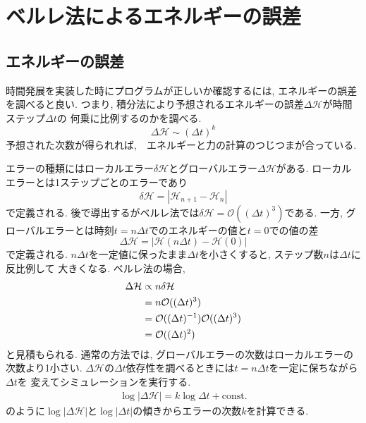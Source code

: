 \section{ベルレ法によるエネルギーの誤差}
\subsection{エネルギーの誤差}
時間発展を実装した時にプログラムが正しいか確認するには, エネルギーの誤差を調べると良い.
つまり, 積分法により予想されるエネルギーの誤差$\Delta \mathcal{H}$が時間ステップ$\Delta t$の
何乗に比例するのかを調べる.
\begin{equation}
 \Delta \mathcal{H} \sim (\Delta t)^{k}
\end{equation}
予想された次数が得られれば,　エネルギーと力の計算のつじつまが合っている.

エラーの種類にはローカルエラー$\delta \mathcal{H}$とグローバルエラー$\Delta \mathcal{H}$がある.
ローカルエラーとは1ステップごとのエラーであり
\begin{equation}
 \delta \mathcal{H} = |\mathcal{H}_{n+1} - \mathcal{H}_{n}|
\end{equation}
で定義される. 
後で導出するがベルレ法では$\delta \mathcal{H} = \mathcal{O}((\Delta t)^{3})$である.
一方, グローバルエラーとは時刻$t = n \Delta t$でのエネルギーの値と$t=0$での値の差
\begin{equation}
 \Delta \mathcal{H} = |\mathcal{H}(n \Delta t) - \mathcal{H}(0)|
\end{equation}
で定義される.
$n \Delta t$を一定値に保ったまま$\Delta t$を小さくすると, ステップ数$n$は$\Delta t$に反比例して
大きくなる. ベルレ法の場合,
\begin{align}
  \Delta \mathcal{H} 
&\propto 
   n \delta \mathcal{H} \notag \\
&= n \mathcal{O} ((\Delta t)^{3}) \notag \\
&=   \mathcal{O} ((\Delta t)^{-1}) \mathcal{O} ((\Delta t)^{3}) \notag \\
&=   \mathcal{O} ((\Delta t)^{2}) \notag
\end{align}
と見積もられる. 
通常の方法では, グローバルエラーの次数はローカルエラーの次数より1小さい.
$\Delta \mathcal{H}$の$\Delta t$依存性を調べるときには$t = n\Delta t$を一定に保ちながら$\Delta t$を
変えてシミュレーションを実行する.
\begin{align}
 \log |\Delta \mathcal{H}| = k \log \Delta t + \mathrm{const.}
\end{align}
のように$\log |\Delta \mathcal{H}|$と$\log |\Delta t|$の傾きからエラーの次数$k$を計算できる.

